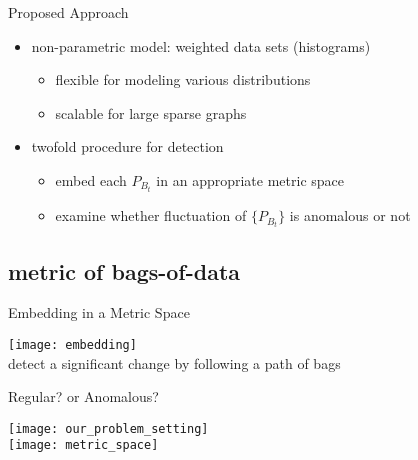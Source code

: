 \documentclass[fleqn,aspectratio=1610]{beamer}
\begin{document}
\begin{frame}[label={sec:org73bc095}]{Proposed Approach}
\begin{itemize}
\item non-parametric model: \alert{weighted data sets (histograms)}
\begin{itemize}
\item flexible for modeling various distributions
\item scalable for large sparse graphs
\end{itemize}
\end{itemize}
\bigskip
\begin{itemize}
\item twofold procedure for detection
\begin{itemize}
\item embed each \(P_{B_t}\) in an appropriate metric space
\item examine whether fluctuation of \(\{P_{B_t}\}\)
is anomalous or not
\end{itemize}
\end{itemize}
\end{frame}

\subsection{metric of bags-of-data}
\label{sec:org39dbb8a}
\begin{frame}[label={sec:org65be65e}]{Embedding in a Metric Space}
\begin{center}
\texttt{[image: embedding]}\\[0pt]
detect a significant change by following a path of bags
\end{center}
\end{frame}

\begin{frame}[label={sec:org56d6828}]{Regular? or Anomalous?}
\begin{center}
\texttt{[image: our\_problem\_setting]}
\\[10pt]
\texttt{[image: metric\_space]}
\end{center}
\end{frame}
\end{document}
